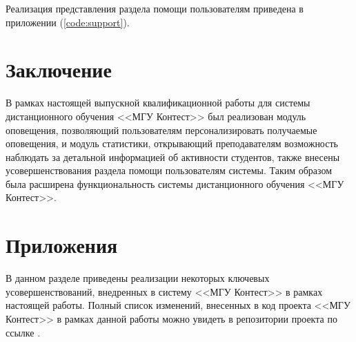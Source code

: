 \documentclass[12pt, a4paper, oneside]{article}
\begin{document}
Реализация представления раздела помощи пользователям приведена в приложении (\ref{code:support}).
\newpage

\section{Заключение}
В рамках настоящей выпускной квалификационной работы для системы дистанционного обучения <<МГУ Контест>> был реализован модуль оповещения, позволяющий пользователям персонализировать получаемые оповещения, и модуль статистики, открывающий преподавателям возможность наблюдать за детальной информацией об активности студентов, также внесены усовершенствования раздела помощи пользователям системы. Таким образом была расширена функциональность системы дистанционного обучения <<МГУ Контест>>.
\newpage

\section{Приложения}
В данном разделе приведены реализации некоторых ключевых усовершенствований, внедренных в систему <<МГУ Контест>> в рамках настоящей работы. Полный список изменений, внесенных в код проекта <<МГУ Контест>> в рамках данной работы можно увидеть в репозитории проекта по ссылке \cite{msu-contest-commits}.
\end{document}
